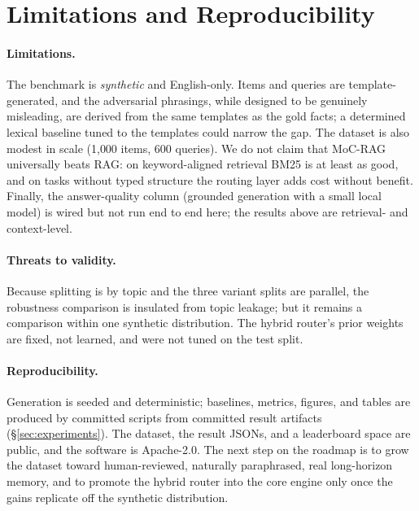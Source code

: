 \section{Limitations and Reproducibility}

\paragraph{Limitations.} The benchmark is \emph{synthetic} and English-only.
Items and queries are template-generated, and the adversarial phrasings, while
designed to be genuinely misleading, are derived from the same templates as the
gold facts; a determined lexical baseline tuned to the templates could narrow
the gap. The dataset is also modest in scale (1{,}000 items, 600 queries). We do
not claim that MoC-RAG universally beats RAG: on keyword-aligned retrieval BM25
is at least as good, and on tasks without typed structure the routing layer adds
cost without benefit. Finally, the answer-quality column (grounded generation
with a small local model) is wired but not run end to end here; the results
above are retrieval- and context-level.

\paragraph{Threats to validity.} Because splitting is by topic and the three
variant splits are parallel, the robustness comparison is insulated from topic
leakage; but it remains a comparison within one synthetic distribution. The
hybrid router's prior weights are fixed, not learned, and were not tuned on the
test split.

\paragraph{Reproducibility.} Generation is seeded and deterministic; baselines,
metrics, figures, and tables are produced by committed scripts from committed
result artifacts (\S\ref{sec:experiments}). The dataset, the result JSONs, and a
leaderboard space are public, and the software is Apache-2.0. The next step on
the roadmap is to grow the dataset toward human-reviewed, naturally paraphrased,
real long-horizon memory, and to promote the hybrid router into the core engine
only once the gains replicate off the synthetic distribution.
